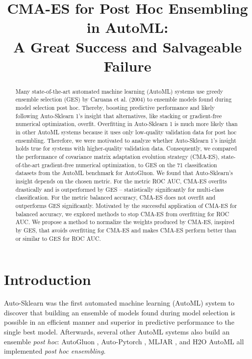 \documentclass[11pt]{article}
\title{CMA-ES for Post Hoc Ensembling in AutoML:\\ A Great Success and Salvageable Failure
}
\author[1]{\nameemail{Lennart Purucker}{lennart.purucker@uni-siegen.de}}
\author[1]{\nameemail{Joeran Beel}{joeran.beel@uni-siegen.de}}
\affil[1]{University of Siegen}
\newcommand{\nbc}[3]{
		{\colorbox{#3}{\bfseries\sffamily\scriptsize\textcolor{white}{#1}}}
		{\textcolor{#3}{\sf\small$\blacktriangleright$\textit{#2}$\blacktriangleleft$}}
}
\newcommand{\changed}[1]{\nbc{CHANGED}{#1}{changedcolor}}
\renewcommand{\changed}[1]{{\color{changedcolor}#1}}
\renewcommand{\changed}[1]{{#1}}
\begin{document}
\maketitle

\begin{abstract}
Many state-of-the-art automated machine learning (AutoML) systems use greedy ensemble selection (GES) by Caruana et al. (2004) to ensemble models found during model selection post hoc. 
Thereby, boosting predictive performance and likely following Auto-Sklearn 1's insight that alternatives, like stacking or gradient-free numerical optimization, overfit. 
Overfitting in Auto-Sklearn 1 is much more likely than in other AutoML systems because it uses only low-quality validation data for post hoc ensembling.
Therefore, we were motivated to analyze whether Auto-Sklearn 1's insight holds true for systems with higher-quality validation data. 
Consequently, we compared the performance of covariance matrix adaptation evolution strategy (CMA-ES), state-of-the-art gradient-free numerical optimization, to GES on the 71 classification datasets from the AutoML benchmark for AutoGluon. 
We found that Auto-Sklearn's insight depends on the chosen metric. 
For the metric ROC AUC, CMA-ES overfits drastically and is outperformed by GES -- statistically significantly for multi-class classification. 
For the metric balanced accuracy, CMA-ES does not overfit and outperforms GES significantly. 
Motivated by the successful application of CMA-ES for balanced accuracy, we explored methods to stop CMA-ES from overfitting for ROC AUC. 
We propose a method to normalize the weights produced by CMA-ES, inspired by GES, that avoids overfitting for CMA-ES and makes CMA-ES perform better than or similar to GES for ROC AUC. 
\end{abstract}

\changed{\section{Introduction}}
Auto-Sklearn \citep{ask1} was the first automated machine learning (AutoML) system to discover that building an ensemble of models found during model selection is possible in an efficient manner and superior in predictive performance to the single best model. 
Afterwards, several other AutoML systems also build an ensemble \emph{post hoc}:
AutoGluon \citep{ag1}, Auto-Pytorch \citep{apt1, apt2}, MLJAR \citep{mljar}, and H2O AutoML \citep{H2OAutoML20} all implemented \emph{post hoc ensembling}. 
\end{document}
